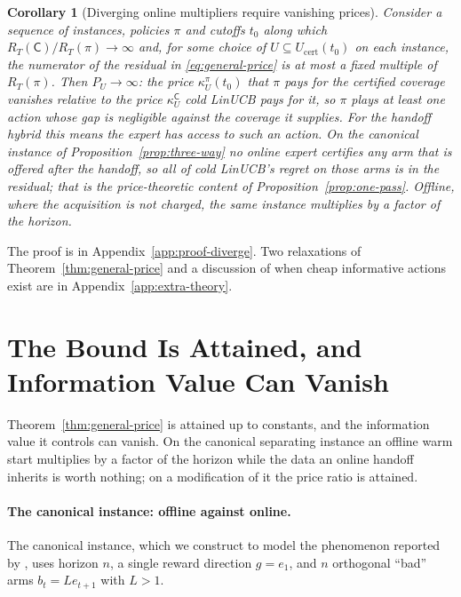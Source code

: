 \documentclass{article}
\newtheorem{corollary}{Corollary}
\theoremstyle{definition}
\theoremstyle{remark}
\theoremstyle{remark}
\newcommand{\Cold}{\mathsf{C}}
\begin{document}
\begin{corollary}[Diverging online multipliers require vanishing prices]
\label{cor:diverge}
Consider a sequence of instances, policies $\pi$ and cutoffs $t_0$ along
which $R_T(\Cold)/R_T(\pi)\to\infty$ and, for some choice of
$U\subseteq U_{\mathrm{cert}}(t_0)$ on each instance, the numerator of the
residual in \eqref{eq:general-price} is at most a fixed multiple of $R_T(\pi)$.
Then $P_U\to\infty$: the price $\kappa^\pi_U(t_0)$ that $\pi$ pays for the certified
coverage vanishes relative to the price $\kappa^{\Cold}_U$ cold LinUCB pays for it, so
$\pi$ plays at least one action whose gap is negligible against the coverage it supplies.
For the handoff hybrid this means the expert has access to such an action.
On the canonical instance of Proposition~\ref{prop:three-way} no online expert
certifies any arm that is offered after the handoff, so all of cold LinUCB's
regret on those arms is in the residual; that is the price-theoretic content of
Proposition~\ref{prop:one-pass}. Offline, where the acquisition is not
charged, the same instance multiplies by a factor of the horizon.
\end{corollary}

The proof is in Appendix~\ref{app:proof-diverge}. Two relaxations of
Theorem~\ref{thm:general-price} and a discussion of when cheap informative
actions exist are in Appendix~\ref{app:extra-theory}.

\section{The Bound Is Attained, and Information Value Can Vanish}
\label{sec:catalog}

Theorem~\ref{thm:general-price} is attained up to constants, and the
information value it controls can vanish. On the canonical separating
instance an offline warm start multiplies by a factor of the horizon while the
data an online handoff inherits is worth nothing; on a modification of it the
price ratio is attained.

\paragraph{The canonical instance: offline against online.}
\label{sec:canonical}
The canonical instance, which we construct to model the phenomenon reported
by \cite{chen2024llmdecision}, uses
horizon $n$, a single reward direction $g=e_1$, and $n$ orthogonal ``bad''
arms $b_t=Le_{t+1}$ with $L>1$.
\end{document}
